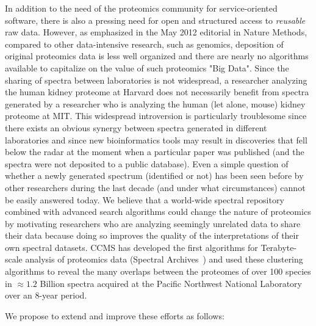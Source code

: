 \documentclass[arial,11pt]{article}
\begin{document}
In addition to the need of the proteomics community for service-oriented software, there is also a pressing need for open and structured access to {\em reusable} raw data. However, as emphasized in the May 2012 editorial in Nature Methods, compared to other data-intensive research, such as genomics, deposition of original proteomics data is less well organized and there are nearly no algorithms available to capitalize on the value of such proteomics "Big Data". Since the sharing of spectra between laboratories is not widespread, a researcher analyzing the human kidney proteome at Harvard does not necessarily benefit from spectra generated by a researcher who is analyzing the human (let alone, mouse) kidney proteome at MIT. This widespread introversion is particularly troublesome since there exists an obvious synergy between spectra generated in different laboratories and since new bioinformatics tools may result in discoveries that fell below the radar at the moment when a particular paper was published (and the spectra were not deposited to a public database). Even a simple question of whether a newly generated spectrum (identified or not) has been seen before by other researchers during the last decade (and under what circumstances) cannot be easily answered today. We believe that a world-wide spectral repository combined with advanced search algorithms could change the nature of proteomics by motivating researchers who are analyzing seemingly unrelated data to share their data because doing so improves the quality of the interpretations of their own spectral datasets. CCMS has developed the first algorithms for Terabyte-scale analysis of proteomics data (Spectral Archives~\cite{frank11}) and used these clustering algorithms to reveal the many overlaps between the proteomes of over 100 species in $\approx 1.2$ Billion spectra acquired at the Pacific Northwest National Laboratory over an 8-year period.

We propose to extend and improve these efforts as follows:
\end{document}
